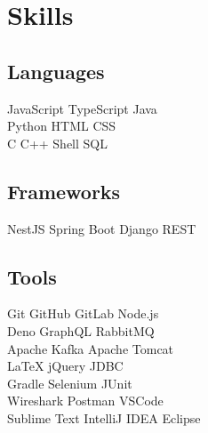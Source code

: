 \documentclass[]{deedy-resume-openfont}
\begin{document}
%
%
\lastupdated

%
%
%
%

\begin{minipage}[t]{0.33\textwidth} 


\section{Skills}
\subsection{Languages}
JavaScript \textbullet{} TypeScript \textbullet Java \\ 
\textbullet{} Python \textbullet{} HTML \textbullet{} CSS \\ 
\textbullet{} C \textbullet{} C++ \textbullet{} Shell \textbullet{} SQL \\

\subsection{Frameworks}
NestJS \textbullet{} Spring Boot \textbullet{} Django REST\\

\subsection{Tools}
Git \textbullet{} GitHub  \textbullet{} GitLab  \textbullet{} Node.js \\
\textbullet{} Deno \textbullet{} GraphQL \textbullet{} RabbitMQ\\
\textbullet{} Apache Kafka \textbullet{} Apache Tomcat \\
\textbullet{} LaTeX \textbullet{} jQuery \textbullet{} JDBC \\
\textbullet{} Gradle \textbullet{} Selenium \textbullet{} JUnit  \\ 
\textbullet{} Wireshark \textbullet{} Postman \textbullet{} VSCode \\
\textbullet{} Sublime Text \textbullet{} IntelliJ IDEA \textbullet{} Eclipse 
\sectionsep


\end{minipage}
\end{document}
